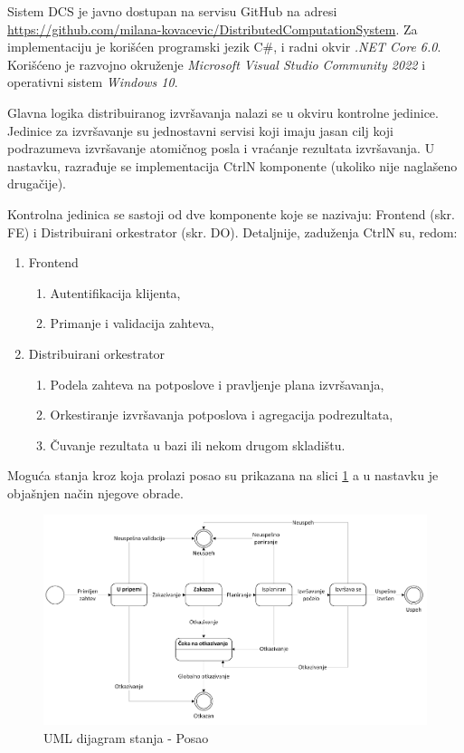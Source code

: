 \documentclass[12pt,oneside]{memoir}
\begin{document}
Sistem DCS je javno dostupan na servisu GitHub na adresi \href{https://github.com/milana-kovacevic/DistributedComputationSystem}{https://github.com/milana-kovacevic/DistributedComputationSystem}\label{githubdsc}. Za implementaciju je korišćen programski jezik C\#, i radni okvir \emph{.NET Core 6.0}. Korišćeno je razvojno okruženje \emph{Microsoft Visual Studio Community 2022} i operativni sistem \emph{Windows 10}.

Glavna logika distribuiranog izvršavanja nalazi se u okviru kontrolne jedinice. Jedinice za izvršavanje su jednostavni servisi koji imaju jasan cilj koji podrazumeva izvršavanje atomičnog posla i vraćanje rezultata izvršavanja. U nastavku, razrađuje se implementacija CtrlN komponente (ukoliko nije naglašeno drugačije).

Kontrolna jedinica se sastoji od dve komponente koje se nazivaju: Frontend (skr. FE) i Distribuirani orkestrator (skr. DO). Detaljnije, zaduženja CtrlN su, redom:
\begin{enumerate}
\item Frontend
	\begin{enumerate}
	\item Autentifikacija klijenta,
	\item Primanje i validacija zahteva,
	\end{enumerate}
\item Distribuirani orkestrator
	\begin{enumerate}
	\item \label{podela_planiranje}Podela zahteva na potposlove i pravljenje plana izvršavanja,
	\item \label{orkestriranje}Orkestiranje izvršavanja potposlova i agregacija podrezultata,
	\item \label{cuvanje_u_bazi}Čuvanje rezultata u bazi ili nekom drugom skladištu.
	\end{enumerate}
\end{enumerate}

Moguća stanja kroz koja prolazi posao su prikazana na slici \ref{fig:stanjaposla} a u nastavku je objašnjen način njegove obrade.

\begin{figure}[!ht]
  \centering
  \includegraphics[width=1.0\textwidth]{./images/dijagram_stanja_posao.png}
  \caption{UML dijagram stanja - Posao}
  \label{fig:stanjaposla}
\end{figure}
\end{document}
